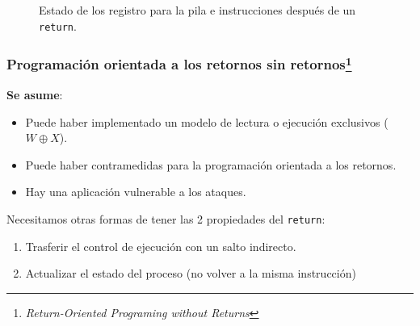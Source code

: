 \documentclass{beamer}
\newcommand { \return } {\texttt{return}\xspace}
\begin{document}
\begin{frame}
{\begin{figure}[h]
            \caption{Estado de los registro para la pila e instrucciones después de un \return.}
        \end{figure}
    }
\end{frame}

\begin{frame}
    \frametitle{Programación orientada a los retornos sin retornos\footnote{\textit{Return-Oriented Programing without Returns}}}
    \textbf{Se asume}:
    \begin{itemize}
        \item Puede haber implementado un modelo de lectura o ejecución exclusivos ($W \oplus X$).
        \item Puede haber contramedidas para la programación orientada a los retornos.
        \item Hay una aplicación vulnerable a los ataques.
    \end{itemize}

    Necesitamos otras formas de tener las 2 propiedades del \return:
    \begin{enumerate}
        \item Trasferir el control de ejecución con un salto indirecto.
        \item Actualizar el estado del proceso (no volver a la misma instrucción)
    \end{enumerate}
\end{frame}
\end{document}

